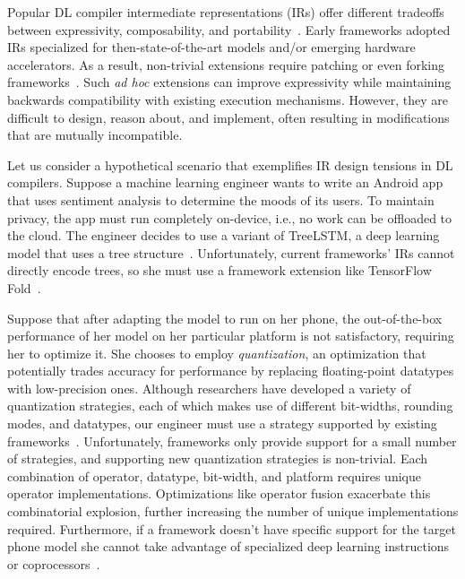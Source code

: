 Popular DL compiler intermediate representations (IRs) offer different tradeoffs
  between expressivity, composability, and portability~\citep{
    tensorflow, pytorch_ad, chainer_learningsys2015, tangent, theano, glow}.
Early frameworks adopted IRs
  specialized for then-state-of-the-art models and/or
  emerging hardware accelerators.
As a result, non-trivial extensions require
  patching or even forking frameworks~\citep{
    tf_fold, tf_lite, tangent, tf_eager, xla, glow, torchscript}.
Such \textit{ad hoc} extensions can improve expressivity
  while maintaining backwards compatibility with existing execution mechanisms.
However, they are difficult to design, reason about, and implement,
  often resulting in modifications that are mutually incompatible.

Let us consider a hypothetical scenario that exemplifies
  IR design tensions in DL compilers.
Suppose a machine learning engineer wants to write
  an Android app that uses sentiment analysis to
  determine the moods of its users.
To maintain privacy, the app must run completely on-device,
  i.e., no work can be offloaded to the cloud.
The engineer decides to use a variant of TreeLSTM,
  a deep learning model that uses a tree structure~\citep{tree_lstm}.
Unfortunately, current frameworks' IRs cannot directly encode trees,
  so she must use a framework extension
  like TensorFlow Fold~\citep{tensorflowfold}.

Suppose that after adapting the model to run on her phone,
  the out-of-the-box performance of her
  model on her particular platform is not satisfactory, requiring her to optimize it.
She chooses to employ \textit{quantization}, an optimization that
  potentially trades accuracy for performance by replacing
  floating-point datatypes with low-precision ones.
Although researchers have developed a variety of quantization
  strategies, each of which makes use of different bit-widths, rounding
  modes, and datatypes, our engineer must use a strategy supported
  by existing frameworks~\citep{gustafson2015end, tf_lite_ops_compat, glow_quant}.
Unfortunately, frameworks only provide support for a small number
  of strategies, and supporting new quantization strategies is non-trivial.
Each combination of operator, datatype, bit-width, and
  platform requires unique operator implementations.
Optimizations like operator fusion exacerbate this combinatorial explosion,
  further increasing
  the number of unique implementations required.
Furthermore, if a framework doesn't have specific support for
  the target phone model she cannot take advantage of specialized deep learning
  instructions or coprocessors~\citep{apple_neural_engine}.

